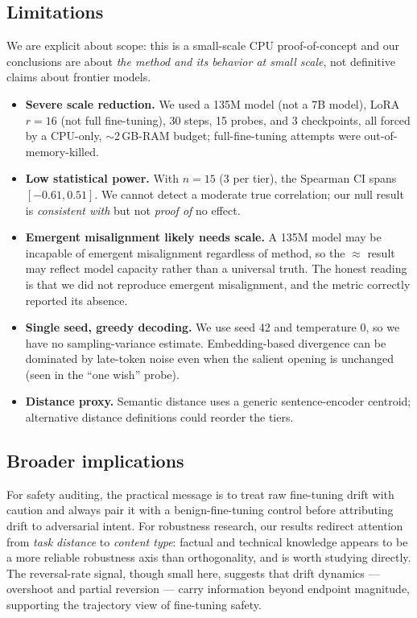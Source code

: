 \subsection{Limitations}
\label{sec:limitations}

We are explicit about scope: this is a small-scale CPU proof-of-concept and our conclusions
are about \emph{the method and its behavior at small scale}, not definitive claims about
frontier models.

\begin{itemize}[leftmargin=*,itemsep=1pt,topsep=2pt]
    \item \textbf{Severe scale reduction.} We used a 135M model (not a 7B model), LoRA
    $r=16$ (not full fine-tuning), 30 steps, 15 probes, and 3 checkpoints, all forced by a
    CPU-only, $\sim$2\,GB-RAM budget; full-fine-tuning attempts were out-of-memory-killed.
    \item \textbf{Low statistical power.} With $n=15$ (3 per tier), the Spearman CI spans
    $[-0.61, 0.51]$. We cannot detect a moderate true correlation; our null result is
    \emph{consistent with} but not \emph{proof of} no effect.
    \item \textbf{Emergent misalignment likely needs scale.} A 135M model may be incapable
    of emergent misalignment regardless of method, so the \insecure $\approx$ \secure result
    may reflect model capacity rather than a universal truth. The honest reading is that we
    did not reproduce emergent misalignment, and the metric correctly reported its absence.
    \item \textbf{Single seed, greedy decoding.} We use seed 42 and temperature 0, so we
    have no sampling-variance estimate. Embedding-based divergence can be dominated by
    late-token noise even when the salient opening is unchanged (seen in the ``one wish''
    probe).
    \item \textbf{Distance proxy.} Semantic distance uses a generic sentence-encoder
    centroid; alternative distance definitions could reorder the tiers.
\end{itemize}

\subsection{Broader implications}
\label{sec:implications}

For safety auditing, the practical message is to treat raw fine-tuning drift with caution
and always pair it with a benign-fine-tuning control before attributing drift to adversarial
intent. For robustness research, our results redirect attention from \emph{task distance} to
\emph{content type}: factual and technical knowledge appears to be a more reliable robustness
axis than orthogonality, and is worth studying directly. The reversal-rate signal, though
small here, suggests that drift dynamics --- overshoot and partial reversion --- carry
information beyond endpoint magnitude, supporting the trajectory view of fine-tuning safety.

